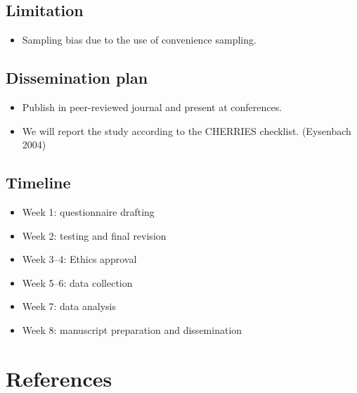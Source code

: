 \documentclass[
  letterpaper,
  DIV=11,
  numbers=noendperiod]{scrartcl}
\providecommand{\tightlist}{%
  \setlength{\itemsep}{0pt}\setlength{\parskip}{0pt}}
\begin{document}
\subsection{Limitation}\label{limitation}

\begin{itemize}
\tightlist
\item
  Sampling bias due to the use of convenience sampling.
\end{itemize}

\subsection{Dissemination plan}\label{dissemination-plan}

\begin{itemize}
\item
  Publish in peer-reviewed journal and present at conferences.
\item
  We will report the study according to the CHERRIES checklist.
  (Eysenbach 2004)
\end{itemize}

\subsection{Timeline}\label{timeline}

\begin{itemize}
\item
  Week 1: questionnaire drafting
\item
  Week 2: testing and final revision
\item
  Week 3--4: Ethics approval
\item
  Week 5--6: data collection
\item
  Week 7: data analysis
\item
  Week 8: manuscript preparation and dissemination
\end{itemize}

\section*{References}\label{references}
\end{document}
